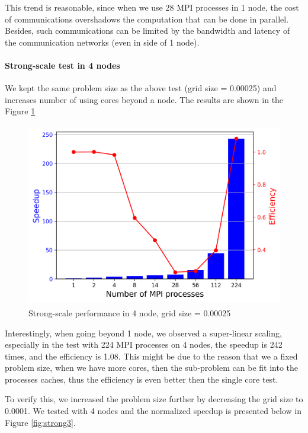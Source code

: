 \documentclass[article]{scrartcl}
\begin{document}
This trend is reasonable, since when we use 28 MPI processes in 1 node, the cost of communications overshadows the computation that can be done in parallel. Besides, such communications can be limited by the bandwidth and latency of the communication networks (even in side of 1 node).
   
\paragraph{Strong-scale test in 4 nodes}
We kept the same problem size as the above test (grid size = 0.00025) and increases number of using cores beyond a node. The results are shown in the Figure \ref{fig:strong2}

\begin{figure}[htpb]
  \centering
  \includegraphics[width=\textwidth,height=8cm,keepaspectratio=true]{../figs/5_strong_4.png}
  \caption{Strong-scale performance in 4 node, grid size = 0.00025}
  \label{fig:strong2}
\end{figure}

Interestingly, when going beyond 1 node, we observed a super-linear scaling, especially in the test with 224 MPI processes on 4 nodes, the speedup is 242 times, and the efficiency is 1.08. This might be due to the reason that we a fixed problem size, when we have more cores, then the sub-problem can be fit into the processes caches, thus the efficiency is even better then the single core test. 

To verify this, we increased the problem size further by decreasing the grid size to 0.0001. We tested with 4 nodes and the normalized speedup is presented below in Figure \ref{fig:strong3}.   
\end{document}

